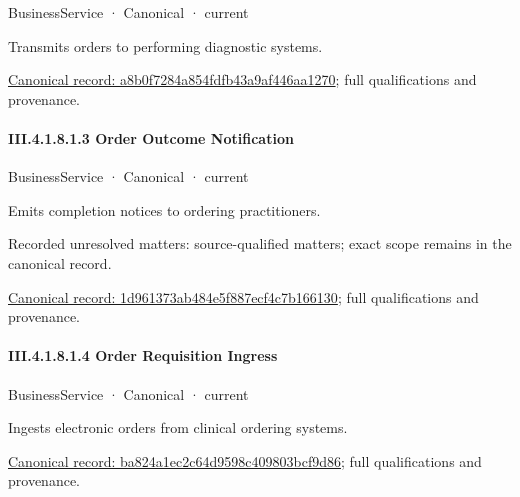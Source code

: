 \label{element:a8b0f7284a854fdfb43a9af446aa1270}
{\small BusinessService · Canonical · current}\par

Transmits orders to performing diagnostic systems.


{\footnotesize \href{../../../../continuum/business/business-service/a8b0f7284a854fdfb43a9af446aa1270.md}{Canonical record: a8b0f7284a854fdfb43a9af446aa1270}; full qualifications and provenance.}\par
\paragraph*{III.4.1.8.1.3 Order Outcome Notification}
\label{navigation:III.4.1.8.1.3}

\label{element:1d961373ab484e5f887ecf4c7b166130}
{\small BusinessService · Canonical · current}\par

Emits completion notices to ordering practitioners.


{\small Recorded unresolved matters: source-qualified matters; exact scope remains in the canonical record.}\par
{\footnotesize \href{../../../../continuum/business/business-service/1d961373ab484e5f887ecf4c7b166130.md}{Canonical record: 1d961373ab484e5f887ecf4c7b166130}; full qualifications and provenance.}\par
\paragraph*{III.4.1.8.1.4 Order Requisition Ingress}
\label{navigation:III.4.1.8.1.4}

\label{element:ba824a1ec2c64d9598c409803bcf9d86}
{\small BusinessService · Canonical · current}\par

Ingests electronic orders from clinical ordering systems.


{\footnotesize \href{../../../../continuum/business/business-service/ba824a1ec2c64d9598c409803bcf9d86.md}{Canonical record: ba824a1ec2c64d9598c409803bcf9d86}; full qualifications and provenance.}\par
